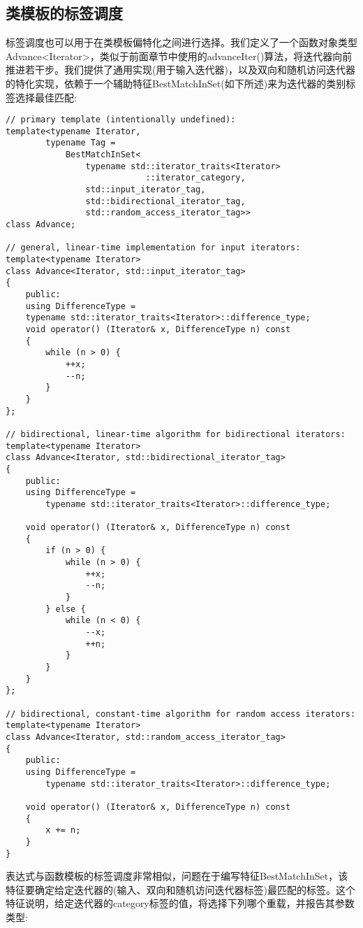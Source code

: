 \subsection{类模板的标签调度}

标签调度也可以用于在类模板偏特化之间进行选择。我们定义了一个函数对象类型Advance<Iterator>，类似于前面章节中使用的advanceIter()算法，将迭代器向前推进若干步。我们提供了通用实现(用于输入迭代器)，以及双向和随机访问迭代器的特化实现，依赖于一个辅助特征BestMatchInSet(如下所述)来为迭代器的类别标签选择最佳匹配:

\begin{lstlisting}[style=styleCXX]
// primary template (intentionally undefined):
template<typename Iterator,
		typename Tag =
			BestMatchInSet<
				typename std::iterator_traits<Iterator>
							::iterator_category,
				std::input_iterator_tag,
				std::bidirectional_iterator_tag,
				std::random_access_iterator_tag>>
class Advance;

// general, linear-time implementation for input iterators:
template<typename Iterator>
class Advance<Iterator, std::input_iterator_tag>
{
	public:
	using DifferenceType =
	typename std::iterator_traits<Iterator>::difference_type;
	void operator() (Iterator& x, DifferenceType n) const
	{
		while (n > 0) {
			++x;
			--n;
		}
	}
};

// bidirectional, linear-time algorithm for bidirectional iterators:
template<typename Iterator>
class Advance<Iterator, std::bidirectional_iterator_tag>
{
	public:
	using DifferenceType =
		typename std::iterator_traits<Iterator>::difference_type;
		
	void operator() (Iterator& x, DifferenceType n) const
	{
		if (n > 0) {
			while (n > 0) {
				++x;
				--n;
			}
		} else {
			while (n < 0) {
				--x;
				++n;
			}
		}
	}
};

// bidirectional, constant-time algorithm for random access iterators:
template<typename Iterator>
class Advance<Iterator, std::random_access_iterator_tag>
{
	public:
	using DifferenceType =
		typename std::iterator_traits<Iterator>::difference_type;
		
	void operator() (Iterator& x, DifferenceType n) const
	{
		x += n;
	}
}
\end{lstlisting}

表达式与函数模板的标签调度非常相似，问题在于编写特征BestMatchInSet，该特征要确定给定迭代器的(输入、双向和随机访问迭代器标签)最匹配的标签。这个特征说明，给定迭代器的category标签的值，将选择下列哪个重载，并报告其参数类型:

